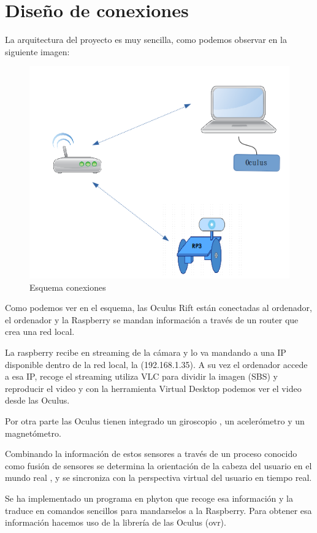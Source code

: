 \documentclass[twoside, 11pt]{epstfg}
\begin{document}
\section{Diseño de conexiones}

La arquitectura del proyecto es muy sencilla, como podemos observar en la siguiente imagen:

\begin{figure}[h]
	\centerline{
		\mbox{\includegraphics[width=.80\textwidth]{images/EsquemaConexiones.png}}
	}
	\caption{Esquema conexiones}
\end{figure}


Como podemos ver en el esquema, las Oculus Rift están conectadas al ordenador, el ordenador y la Raspberry se mandan información a través de un router que crea una red local.

La raspberry recibe en streaming de la cámara y lo va mandando a una IP disponible dentro de la red local, la (192.168.1.35). A su vez el ordenador accede a esa IP, recoge el streaming utiliza VLC para dividir la imagen (SBS) y reproducir el video y con la herramienta Virtual Desktop podemos ver el video desde las Oculus.

Por otra parte las Oculus tienen integrado un giroscopio , un acelerómetro y un magnetómetro.

Combinando la información de estos sensores a través de un proceso conocido como fusión de sensores se determina la orientación de la cabeza del usuario en el mundo real , y se sincroniza con la perspectiva virtual del usuario en tiempo real. 

Se ha implementado un programa en phyton que recoge esa información y la traduce en comandos sencillos para mandarselos a la Raspberry. Para obtener esa información hacemos uso de la librería de las Oculus (ovr).
\end{document}
